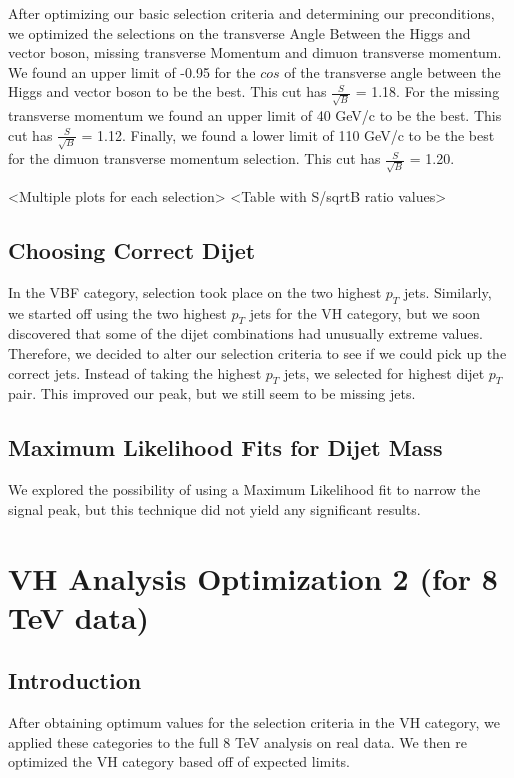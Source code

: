 \documentclass[12pt]{article}
\begin{document}
After optimizing our basic selection criteria and determining our preconditions, 
we optimized the selections on the transverse Angle Between the Higgs and vector boson, missing transverse Momentum and dimuon transverse momentum. 
We found an upper limit of -0.95 for the $cos$ of the transverse angle between the Higgs and vector boson to be the best. 
This cut has $\frac{S}{\sqrt{B}}$ = 1.18. For the missing transverse momentum we found an upper limit of 40 GeV/c to be the best. 
This cut has $\frac{S}{\sqrt{B}}$ = 1.12. Finally, we found a lower limit of 110 GeV/c to be the best for the dimuon transverse momentum selection. 
This cut has $\frac{S}{\sqrt{B}}$ = 1.20.

<Multiple plots for each selection>
<Table with S/sqrtB ratio values>

\subsection{Choosing Correct Dijet}

In the VBF category, selection took place on the two highest $p_{T}$ jets. 
Similarly, we started off using the two highest $p_{T}$ jets for the VH category, 
but we soon discovered that some of the dijet combinations had unusually extreme values. 
Therefore, we decided to alter our selection criteria to see if we could pick up the correct jets. 
Instead of taking the highest $p_{T}$ jets, we selected for highest dijet $p_{T}$ pair. This improved our peak, but we still seem to be missing jets.

\subsection{Maximum Likelihood Fits for Dijet Mass}

We explored the possibility of using a Maximum Likelihood fit to narrow the signal peak, but this technique did not yield any significant results.

\section{VH Analysis Optimization 2 (for 8 TeV data)}

\subsection{Introduction}

After obtaining optimum values for the selection criteria in the VH category, we applied these categories to the full 8 TeV analysis on real data. 
We then re optimized the VH category based off of expected limits. 
\end{document}
